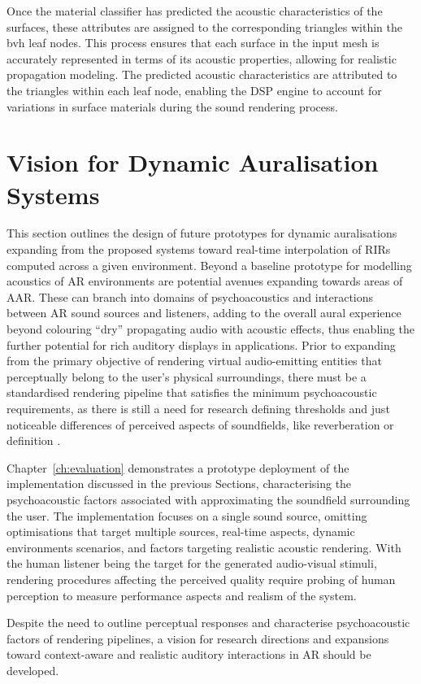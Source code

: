 Once the material classifier has predicted the acoustic characteristics of the surfaces, these attributes are assigned to the corresponding triangles within the \acrshort{bvh} leaf nodes. This process ensures that each surface in the input mesh is accurately represented in terms of its acoustic properties, allowing for realistic propagation modeling. The predicted acoustic characteristics are attributed to the triangles within each leaf node, enabling the DSP engine to account for variations in surface materials during the sound rendering process.

\section{Vision for Dynamic Auralisation Systems}
This section outlines the design of future prototypes for dynamic auralisations expanding from the proposed systems toward real-time interpolation of RIRs computed across a given environment. 
Beyond a baseline prototype for modelling acoustics of AR environments are potential avenues expanding towards areas of AAR. These can branch into domains of psychoacoustics and interactions between AR sound sources and listeners, adding to the overall aural experience beyond colouring ``dry'' propagating audio with acoustic effects, thus enabling the further potential for rich auditory displays in applications. Prior to expanding from the primary objective of rendering virtual audio-emitting entities that perceptually belong to the user's physical surroundings, there must be a standardised rendering pipeline that satisfies the minimum psychoacoustic requirements, as there is still a need for research defining thresholds and just noticeable differences of perceived aspects of soundfields, like reverberation or definition \citep{yang2022audio}.\par
Chapter~\ref{ch:evaluation} demonstrates a prototype deployment of the implementation discussed in the previous Sections, characterising the psychoacoustic factors associated with approximating the soundfield surrounding the user. The implementation focuses on a single sound source, omitting optimisations that target multiple sources, real-time aspects, dynamic environments scenarios, and factors targeting realistic acoustic rendering. With the human listener being the target for the generated audio-visual stimuli, rendering procedures affecting the perceived quality require probing of human perception to measure performance aspects and realism of the system. \par
Despite the need to outline perceptual responses and characterise psychoacoustic factors of rendering pipelines, a vision for research directions and expansions toward context-aware and realistic auditory interactions in AR should be developed.

